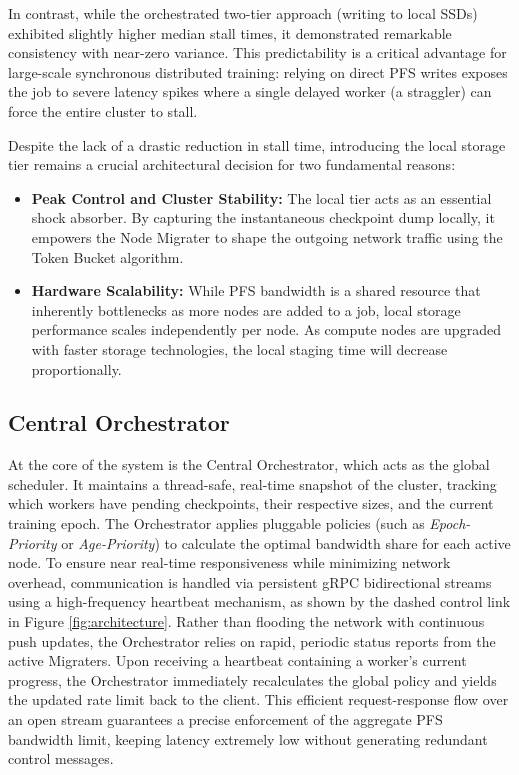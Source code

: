 \documentclass[sigplan,twocolumn,10pt,nonacm]{acmart}
\begin{document}
In contrast, while the orchestrated two-tier approach (writing to local SSDs) exhibited slightly higher median stall times, it demonstrated remarkable consistency
with near-zero variance. This predictability is a critical advantage for large-scale synchronous distributed training: relying on direct PFS writes exposes the job
to severe latency spikes where a single delayed worker (a straggler) can force the entire cluster to stall.

Despite the lack of a drastic reduction in stall time, introducing the local storage tier remains a crucial architectural decision for two fundamental reasons:

\begin{itemize}
    \item \textbf{Peak Control and Cluster Stability:} The local tier acts as an essential shock absorber. By capturing the instantaneous checkpoint dump locally,
    it empowers the Node Migrater to shape the outgoing network traffic using the Token Bucket algorithm.

    \item \textbf{Hardware Scalability:} While PFS bandwidth is a shared resource that inherently bottlenecks as more nodes are added to a job, local storage
    performance scales independently per node. As compute nodes are upgraded with faster storage technologies, the local staging time will decrease proportionally.
\end{itemize}

\subsection{Central Orchestrator}

At the core of the system is the Central Orchestrator, which acts as the global scheduler. It maintains a thread-safe, real-time snapshot of the cluster, tracking
which workers have pending checkpoints, their respective sizes, and the current training epoch. The Orchestrator applies pluggable policies (such as \textit{Epoch-Priority}
or \textit{Age-Priority}) to calculate the optimal bandwidth share for each active node. To ensure near real-time responsiveness while minimizing network overhead,
communication is handled via persistent gRPC bidirectional streams using a high-frequency heartbeat mechanism, as shown by the dashed control link in Figure \ref{fig:architecture}.
Rather than flooding the network with continuous push updates, the Orchestrator relies on rapid, periodic status reports from the active Migraters. Upon receiving a
heartbeat containing a worker's current progress, the Orchestrator immediately recalculates the global policy and yields the updated rate limit back to the client.
This efficient request-response flow over an open stream guarantees a precise enforcement of the aggregate PFS bandwidth limit, keeping latency extremely low without
generating redundant control messages.
\end{document}
